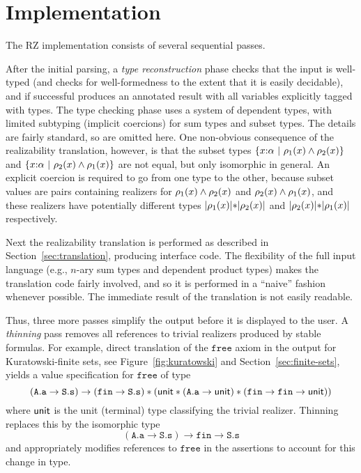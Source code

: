 \section{Implementation}
\label{sec:implementation}

The RZ implementation consists of several sequential passes.

After the initial parsing, a \emph{type reconstruction} phase checks
that the input is well-typed (and checks for well-formedness to the
extent that it is easily decidable), and if successful produces an
annotated result with all variables explicitly tagged with types. The
type checking phase uses a system of dependent types, with limited
subtyping (implicit coercions) for sum types and subset types. The
details are fairly standard, so are omitted here. One non-obvious
consequence of the realizability translation, however, is that the
subset types $\{x{:}\alpha\ |\ \rho_1(x)\land \rho_2(x)\}$ and
$\{x{:}\alpha\ |\ \rho_2(x)\land \rho_1(x)\}$ are not
equal, but only isomorphic in general. An
explicit coercion is required to go from one type to the other,
because subset values are pairs containing realizers for
$\rho_1(x)\land \rho_2(x)$ and
$\rho_2(x)\land \rho_1(x)$, and these realizers have
potentially different types $|\rho_1(x)|\mathtt{*}|\rho_2(x)|$ and
$|\rho_2(x)|\mathtt{*}|\rho_1(x)|$ respectively.

Next the realizability translation is performed as described in
Section~\ref{sec:translation}, producing interface code. The
flexibility of the full input language (e.g., $n$-ary sum types and
dependent product types) makes the translation code fairly involved,
and so it is performed in a ``naive'' fashion whenever possible. The
immediate result of the translation is not easily readable.
 
Thus, three more passes simplify the output before it is displayed to
the user. A \emph{thinning} pass removes all references to trivial
realizers produced by stable formulas. For example, direct translation
of the $\mathtt{free}$ axiom in the output for Kuratowski-finite sets,
see Figure~\ref{fig:kuratowski} and Section~\ref{sec:finite-sets},
yields a value specification for $\mathtt{free}$ of type
%
\begin{equation*}
  (\mathtt{A.a} \to \mathtt{S.s}) \to 
  (\mathtt{fin} \to \mathtt{S.s}) * (\mathsf{unit} * (\mathtt{A.a} \to
  \mathsf{unit}) *
  (\mathtt{fin} \to \mathtt{fin} \to \mathsf{unit}))
\end{equation*}
%
where $\mathsf{unit}$ is the unit (terminal) type classifying the trivial
realizer. Thinning replaces this by the isomorphic type
%
\begin{equation*}
  (\mathtt{A.a} \to \mathtt{S.s}) \to \mathtt{fin} \to \mathtt{S.s}
\end{equation*}
%
and appropriately modifies references to $\mathtt{free}$ in the assertions to account for this change in type.

